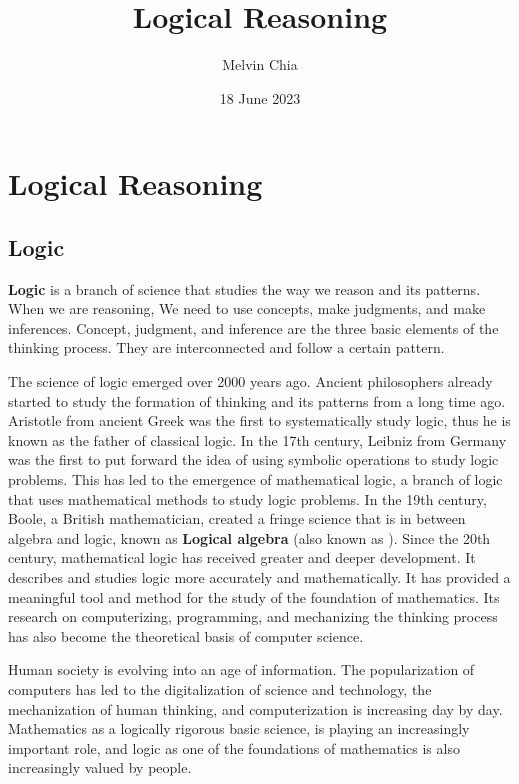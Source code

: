 \documentclass{report}
\title{\Huge{\textbf{Logical Reasoning}}}
\author{Melvin Chia}
\date{18 June 2023}
\begin{document}
\maketitle

\onehalfspacing

\chapter{Logical Reasoning}

\section{Logic}

\textbf{Logic} is a branch of science that studies the way we reason and its patterns. When we are reasoning, We need to use concepts, make judgments, and make inferences. Concept, judgment, and inference are the three basic elements of the thinking process. They are interconnected and follow a certain pattern.

The science of logic emerged over 2000 years ago. Ancient philosophers already
started to study the formation of thinking and its patterns from a long time
ago. Aristotle from ancient Greek was the first to systematically study logic,
thus he is known as the father of classical logic. In the 17th century, Leibniz
from Germany was the first to put forward the idea of using symbolic operations
to study logic problems. This has led to the emergence of mathematical logic, a
branch of logic that uses mathematical methods to study logic problems. In the
19th century, Boole, a British mathematician, created a fringe science that is
in between algebra and logic, known as \textbf{Logical algebra} (also known as
). Since the 20th century, mathematical logic has
received greater and deeper development. It describes and studies logic more
accurately and mathematically. It has provided a meaningful tool and method for
the study of the foundation of mathematics. Its research on computerizing,
programming, and mechanizing the thinking process has also become the
theoretical basis of computer science.

Human society is evolving into an age of information. The popularization of
computers has led to the digitalization of science and technology, the
mechanization of human thinking, and computerization is increasing day by day.
Mathematics as a logically rigorous basic science, is playing an increasingly
important role, and logic as one of the foundations of mathematics is also
increasingly valued by people.
\end{document}

